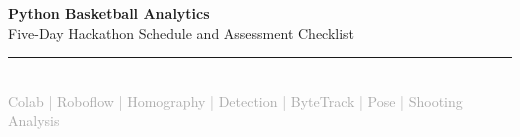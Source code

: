 \documentclass[11pt,a4paper]{article}
\begin{document}
\newcommand{\tasktableheader}{%
  \rowcolor{MainBlue}
  \textcolor{white}{\textbf{Done}} &
  \textcolor{white}{\textbf{ID}} &
  \textcolor{white}{\textbf{Type}} &
  \textcolor{white}{\textbf{Task}} &
  \textcolor{white}{\textbf{Assessment criteria}} &
  \textcolor{white}{\textbf{Pts}} \\ \hline
}

\begin{center}
  {\LARGE\bfseries Python Basketball Analytics}\\[4pt]
  {\Large Five-Day Hackathon Schedule and Assessment Checklist}\\[10pt]
  \rule{0.9\textwidth}{0.6pt}\\[8pt]
  {\large \textcolor{DarkGray}{Colab | Roboflow | Homography | Detection | ByteTrack | Pose | Shooting Analysis}}
\end{center}
\vspace{2mm}
\end{document}
